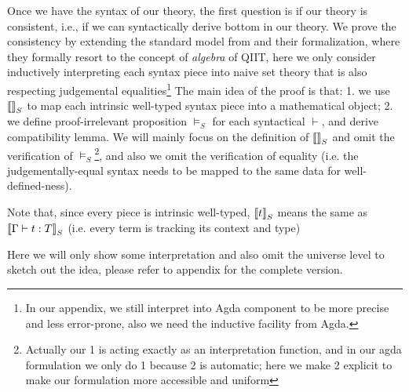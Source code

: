 Once we have the syntax of our theory, the first question is if our theory is consistent, i.e., if we can syntactically derive bottom in our theory. We prove the consistency by extending the standard model from \citep{altenkirch2016type,kaposi2017type, kaposi2019gluing} and their formalization, where they formally resort to the concept of \textit{algebra} of QIIT, here we only consider inductively interpreting each syntax piece into naive set theory that is also respecting judgemental equalities\footnote{In our appendix, we still interpret into Agda component to be more precise and less error-prone, also we need the inductive facility from Agda.} The main idea of the proof is that: 1. we use ${{\llbracket {} \rrbracket}_S}$ to map each intrinsic well-typed syntax piece into a mathematical object; 2. we define proof-irrelevant proposition $\models_S$ for each syntactical $\vdash$, and derive compatibility lemma. We will mainly focus on the definition of ${{\llbracket {} \rrbracket}_S}$ and omit the verification of $\models_S$\footnote{Actually our 1 is acting exactly as an interpretation function, and in our agda formulation we only do 1 because 2 is automatic; here we make 2 explicit to make our formulation more accessible and uniform}, and also we omit the verification of equality (i.e. the judgementally-equal syntax needs to be mapped to the same data for well-defined-ness).

Note that, since every piece is intrinsic well-typed, ${{\llbracket {t} \rrbracket}_S}$ means the same as ${{\llbracket {{ {\Gamma} \vdash {t} : {T} }} \rrbracket}_S}$ (i.e. every term is tracking its context and type)

Here we will only show some interpretation and also omit the universe level to sketch out the idea, please refer to appendix for the complete version. 

\newcommand{\goodCtxS}[2]{{ {#1} \ \models_S }}
\newcommand{\goodTypeS}[3]{{ {#1} \models_S {#2} }}
\newcommand{\goodTermS}[3]{{ {#1} \models_S {#2} : {#3} }}
\newcommand{\goodSubS}[3]{{ {#1} \models_S {#2} : {#3} }}
\newcommand{\goodSigS}[3]{{ {#1} \models_S {#2} \ \  Sig^{#3} }}
\newcommand{\goodWSigS}[3]{{ {#1} \models_S {#2} \ \ WSig^{#3} }}
\newcommand{\goodSealS}[4]{{ {#1} \models_S {#2} : {#3} \  |\  {#4} }}
\newcommand{\goodInhS}[4]{{ {#1} \models_S {#2} : {#3} \twoheadrightarrow {#4}}}

